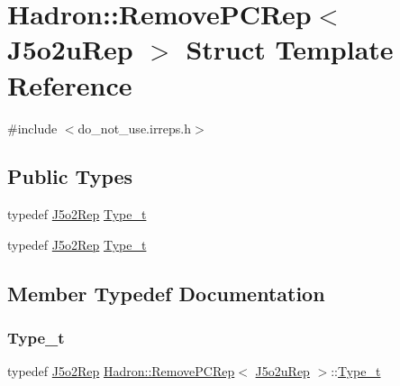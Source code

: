 \hypertarget{structHadron_1_1RemovePCRep_3_01J5o2uRep_01_4}{}\section{Hadron\+:\+:Remove\+P\+C\+Rep$<$ J5o2u\+Rep $>$ Struct Template Reference}
\label{structHadron_1_1RemovePCRep_3_01J5o2uRep_01_4}


{\ttfamily \#include $<$do\+\_\+not\+\_\+use.\+irreps.\+h$>$}

\subsection*{Public Types}
\begin{DoxyCompactItemize}
\item 
typedef \mbox{\hyperlink{structHadron_1_1J5o2Rep}{J5o2\+Rep}} \mbox{\hyperlink{structHadron_1_1RemovePCRep_3_01J5o2uRep_01_4_a374ffbe381e7e02b182dabe0c22a5213}{Type\+\_\+t}}
\item 
typedef \mbox{\hyperlink{structHadron_1_1J5o2Rep}{J5o2\+Rep}} \mbox{\hyperlink{structHadron_1_1RemovePCRep_3_01J5o2uRep_01_4_a374ffbe381e7e02b182dabe0c22a5213}{Type\+\_\+t}}
\end{DoxyCompactItemize}


\subsection{Member Typedef Documentation}
\mbox{\label{structHadron_1_1RemovePCRep_3_01J5o2uRep_01_4_a374ffbe381e7e02b182dabe0c22a5213}} 
\subsubsection{\texorpdfstring{Type\_t}{Type\_t}\hspace{0.1cm}{\footnotesize\ttfamily [1/2]}}
{\footnotesize\ttfamily typedef \mbox{\hyperlink{structHadron_1_1J5o2Rep}{J5o2\+Rep}} \mbox{\hyperlink{structHadron_1_1RemovePCRep}{Hadron\+::\+Remove\+P\+C\+Rep}}$<$ \mbox{\hyperlink{structHadron_1_1J5o2uRep}{J5o2u\+Rep}} $>$\+::\mbox{\hyperlink{structHadron_1_1RemovePCRep_3_01J5o2uRep_01_4_a374ffbe381e7e02b182dabe0c22a5213}{Type\+\_\+t}}}

